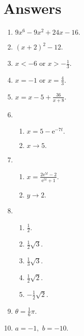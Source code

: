 \documentclass[a4paper,12pt]{exam}
\begin{document}
\section*{Answers}\begin{enumerate}
\item
	$9 x^6 - 9 x^2 + 24 x - 16.$

\item
	$\left( x + 2 \right)^2 - 12.$

\item
	${x < -6}$ or ${x > - \frac{1}{3}.}$

\item
	${x=-1}$ or ${x=\frac{4}{3}.}$

\item
	$\displaystyle x=x - 5 + \frac{36}{x + 8}.$

\item
	
	\begin{enumerate}
		\item
			$\displaystyle x = 5-\mathrm{e}^{- 7 t}.$
		\item
			${x \to 5.}$
	\end{enumerate}

\item
	
	\begin{enumerate}
		\item
			$\displaystyle x = \frac{2 \mathrm{e}^{5 t} - 2}{\mathrm{e}^{5 t} + 1}.$
		\item
			${y \to 2.}$
	\end{enumerate}

\item
	
	\begin{enumerate}
		\item
			${\frac{1}{2}.}$
		\item
			${\frac{1}{2} \sqrt{3}.}$
		\item
			${\frac{1}{3} \sqrt{3}.}$
		\item
			${\frac{1}{2} \sqrt{2}.}$
		\item
			${- \frac{1}{2} \sqrt{2}.}$
	\end{enumerate}

\item
	$\theta = \frac{1}{6} \pi.$

\item
	${a = -1,}$ ${b=-10.}$


\end{enumerate}
\end{document}
